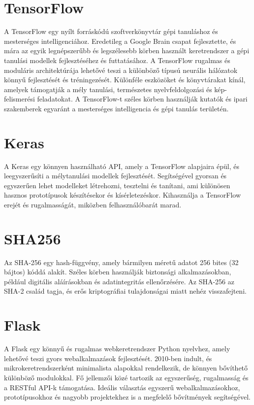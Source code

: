\section{TensorFlow}
A TensorFlow \cite{tensorflow2015-whitepaper} egy nyílt forráskódú szoftverkönyvtár gépi tanuláshoz és mesterséges intelligenciához.
Eredetileg a Google Brain csapat fejlesztette, és mára az egyik legnépszerűbb és legszélesebb körben használt keretrendszer a gépi tanulási modellek fejlesztéséhez és futtatásához.
A TensorFlow rugalmas és moduláris architektúrája lehetővé teszi a különböző típusú neurális hálózatok könnyű fejlesztését és tréningezését. Különféle eszközöket és könyvtárakat kínál, amelyek támogatják a mély tanulási, természetes nyelvfeldolgozási és kép-felismerési feladatokat.
A TensorFlow-t széles körben használják kutatók és ipari szakemberek egyaránt a mesterséges intelligencia és gépi tanulás területén.

\section{Keras}
A Keras \cite{chollet2015keras} egy könnyen használható API, amely a TensorFlow alapjaira épül, és leegyszerűsíti a mélytanulási modellek fejlesztését. Segítségével gyorsan és egyszerűen lehet modelleket létrehozni, tesztelni és tanítani, ami különösen hasznos prototípusok készítésekor és kísérletezéskor. Kihasználja a TensorFlow erejét és rugalmasságát, miközben felhasználóbarát marad.

\section{SHA256}
Az SHA-256 \cite{rfc4634} egy hash-függvény, amely bármilyen méretű adatot 256 bites (32 bájtos) kóddá alakít. Széles körben használják biztonsági alkalmazásokban, például digitális aláírásokban és adatintegritás ellenőrzésére. Az SHA-256 az SHA-2 család tagja, és erős kriptográfiai tulajdonságai miatt nehéz visszafejteni.

\section{Flask}
A Flask \cite{grinberg2018flask} egy könnyű és rugalmas webkeretrendszer Python nyelvhez, amely lehetővé teszi gyors webalkalmazások fejlesztését. 2010-ben indult, és mikrokeretrendszerként minimalista alapokkal rendelkezik, de könnyen bővíthető különböző modulokkal. Fő jellemzői közé tartozik az egyszerűség, rugalmasság és a RESTful API-k támogatása. Ideális választás egyszerű webalkalmazásokhoz, prototípusokhoz és nagyobb projektekhez is a megfelelő bővítmények segítségével.

